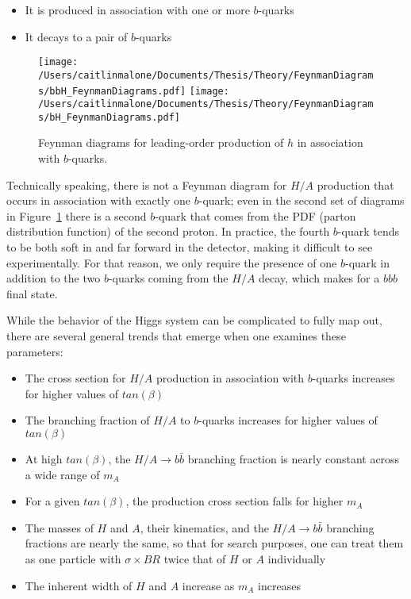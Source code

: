 \begin{itemize}
    \item It is produced in association with one or more $b$-quarks
    \item It decays to a pair of $b$-quarks
\end{itemize}

\begin{figure}[H]
	\texttt{[image: /Users/caitlinmalone/Documents/Thesis/Theory/FeynmanDiagrams/bbH\_FeynmanDiagrams.pdf]}		
	\texttt{[image: /Users/caitlinmalone/Documents/Thesis/Theory/FeynmanDiagrams/bH\_FeynmanDiagrams.pdf]}
	\label{fig:fd}
	\caption{Feynman diagrams for leading-order production of $h$ in association with $b$-quarks.  }
\end{figure}

Technically speaking, there is not a Feynman diagram for $H/A$ production that occurs in association with exactly one $b$-quark; even in the second set of diagrams in Figure~\ref{fig:fd} there is a second $b$-quark that comes from the PDF (parton distribution function) of the second proton.  In practice, the fourth $b$-quark tends to be both soft in \pt and far forward in the detector, making it difficult to see experimentally.  For that reason, we only require the presence of one $b$-quark in addition to the two $b$-quarks coming from the $H/A$ decay, which makes for a $bbb$ final state.



While the behavior of the Higgs system can be complicated to fully map out, there are several general trends that emerge when one examines these parameters:

\begin{itemize}
	\item The cross section for $H/A$ production in association with $b$-quarks increases for higher values of $tan(\beta)$
	\item The branching fraction of $H/A$ to $b$-quarks increases for higher values of $tan(\beta)$
	\item At high $tan(\beta)$, the $H/A\rightarrow b\bar{b}$ branching fraction is nearly constant across a wide range of $m_A$
	\item For a given $tan(\beta)$, the production cross section falls for higher $m_A$
	\item The masses of $H$ and $A$, their kinematics, and the $H/A\rightarrow b\bar{b}$ branching fractions are nearly the same, so that for search purposes, one can treat them as one particle with $\sigma \times BR$ twice that of $H$ or $A$ individually
	\item The inherent width of $H$ and $A$ increase as $m_A$ increases 
\end{itemize}





